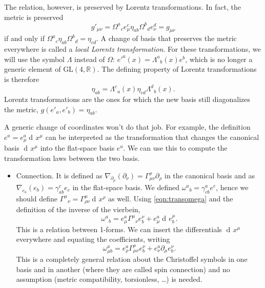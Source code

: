 \documentclass[a4paper,12pt]{book}
\newcommand{\dd}{\mathop{\mathrm{d}\!}{}}
\theoremstyle{definition}
\theoremstyle{remark}
\begin{document}
The relation, however, is preserved by Lorentz transformations. In fact, the metric is preserved 
\[g'_{\mu\nu}=\Omega^a{}_ce^c_\mu\eta_{ab}\Omega^b{}_de^d_\nu=g_{\mu\nu}\]
if and only if $\Omega^a{}_c\eta_{ab}\Omega^b{}_d=\eta_{cd}$.
A change of basis that preserves the metric everywhere is called a \emph{local Lorentz transformation}. For these transformations, we will use the symbol $\Lambda$ instead of $\Omega$: $e'^a(x)=\Lambda^a{}_b(x)e^b$, which is no longer a generic element of $\text{GL}(4,\mathbb{R})$. The defining property of Lorentz transformations is therefore
\[\eta_{ab}=\Lambda^c{}_a(x)\eta_{cd}\Lambda^d{}_b(x).\]
Lorentz transformations are the ones for which the new basis still diagonalizes the metric, $g(e'_a,e'_b)=\eta_{ab}$.

A generic change of coordinates won't do that job. For example, the definition $e^a=e^a_\mu\dd x^\mu$ can be interpreted as the transformation that changes the canonical basis $\dd x^\mu$ into the flat-space basis $e^a$. We can use this to compute the transformation laws between the two basis.
\begin{itemize}
\item Connection. It is defined as $\nabla_{\partial_\mu}(\partial_\nu)=\Gamma_{\mu\nu}^\rho\partial_\rho$ in the canonical basis and as $\nabla_{e_a}(e_b)=\gamma_{ab}^ce_c$ in the flat-space basis. We defined $\omega^a{}_b=\gamma^a_{cb}e^c$, hence we should define $\Gamma^\mu{}_\nu=\Gamma^\mu_{\rho\nu}\dd x^\rho$ as well. Using \cref{eqn:transomega} and the definition of the inverse of the vierbein,
\[\omega^a{}_b=e^a_\mu\Gamma^\mu{}_\nu e^\nu_b+e^a_\mu\dd e^\mu_b.\]
This is a relation between 1-forms. We can insert the differentials $\dd x^\mu$ everywhere and equating the coefficients, writing
\[\omega_{\mu b}^a=e^a_\rho\Gamma^\rho_{\mu\nu}e^\nu_b+e^a_\nu\partial_\mu e^\nu_b.\]
This is a completely general relation about the Christoffel symbols in one basis and in another (where they are called spin connection) and no assumption (metric compatibility, torsionless, \ldots) is needed.

\end{itemize}
\end{document}
